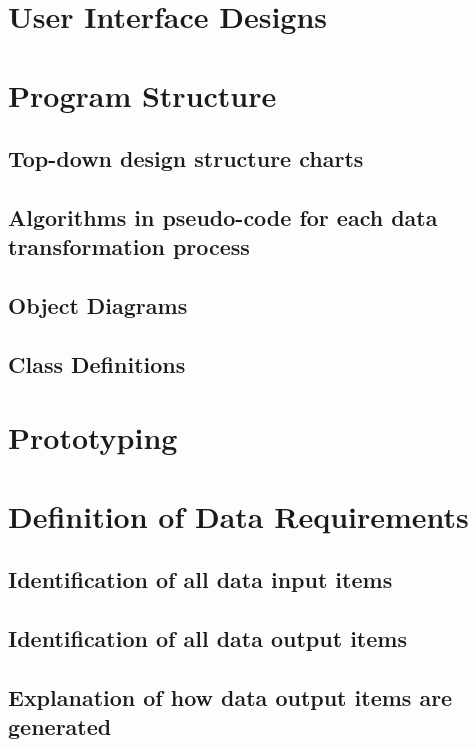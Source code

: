 \section{User Interface Designs}

\section{Program Structure}

\subsection{Top-down design structure charts}

\subsection{Algorithms in pseudo-code for each data transformation process}

\subsection{Object Diagrams}

\subsection{Class Definitions}

\newpage

\section{Prototyping}

\section{Definition of Data Requirements}

\subsection{Identification of all data input items}

\subsection{Identification of all data output items}

\subsection{Explanation of how data output items are generated}

